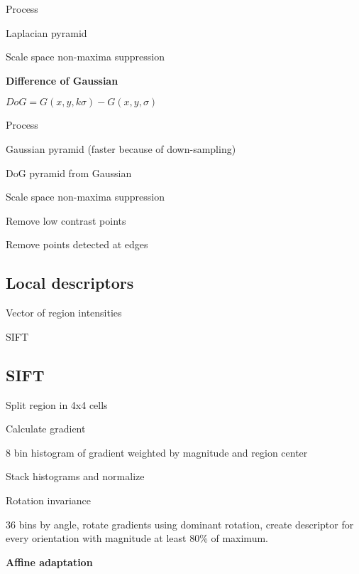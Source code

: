 \documentclass{article}
\begin{document}
\begin{multicols*}{2}
{	Process

	\begin{compactenum}
		\item Laplacian pyramid
		\item Scale space non-maxima suppression
	\end{compactenum}
	\textbf{Difference of Gaussian}

	$DoG = G(x, y, k \sigma) - G(x, y, \sigma)$

	Process

	\begin{compactenum}
		\item Gaussian pyramid (faster because of down-sampling)
		\item DoG pyramid from Gaussian
		\item Scale space non-maxima suppression
		\item Remove low contrast points
		\item Remove points detected at edges
	\end{compactenum}

	\subsection{Local descriptors}

	\begin{compactitem}
		\item Vector of region intensities
		\item SIFT
	\end{compactitem}

	\subsection{SIFT}

	\begin{compactenum}
		\item Split region in 4x4 cells
		\item Calculate gradient
		\item 8 bin histogram of gradient weighted by magnitude and region center
		\item Stack histograms and normalize
	\end{compactenum}

	Rotation invariance

	36 bins by angle, rotate gradients using dominant rotation, create descriptor for every orientation with magnitude at least 80\% of maximum.

	\textbf{Affine adaptation}

}
\end{multicols*}
\end{document}
